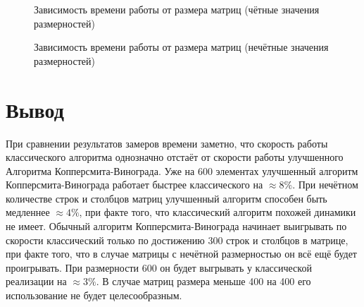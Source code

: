 \documentclass[12pt]{report}
\begin{document}
\begin{figure}[h]
\begin{center}
	\captionsetup{justification=centering}
	\caption{Зависимость времени работы от размера матриц (чётные значения размерностей)}
	\label{timeRes1}
	\end{center}
\end{figure}

\begin{figure}[h]
	\begin{center}
	\captionsetup{justification=centering}
	\caption{Зависимость времени работы от размера матриц (нечётные значения размерностей)}
	\label{timeRes2}
	\end{center}
\end{figure}

\section*{Вывод}
При сравнении результатов замеров времени заметно, что скорость работы классического алгоритма однозначно отстаёт от скорости работы улучшенного Алгоритма Копперсмита-Винограда. Уже на 600 элементах улучшенный алгоритм Копперсмита-Винограда работает быстрее классического на $\approx8\%$. При нечётном количестве строк и столбцов матриц улучшенный алгоритм способен быть медленнее $\approx4\%$, при факте того, что классический алгоритм похожей динамики не имеет. Обычный алгоритм Копперсмита-Винограда начинает выигрывать по скорости классический только по достижению 300 строк и столбцов в матрице, при факте того, что в случае матрицы с нечётной размерностью он всё ещё будет проигрывать. При размерности 600 он будет выгрывать у классической реализации на $\approx3\%$. В случае матриц размера меньше 400 на 400 его использование не будет целесообразным.
\end{document}
